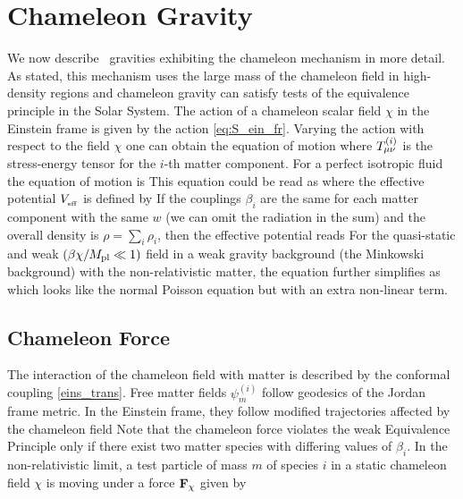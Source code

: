 \section{Chameleon Gravity}
\label{sec_cham}
We now describe \fR\ gravities exhibiting the chameleon mechanism in more detail. As stated, this mechanism uses the large mass of the chameleon field in high-density regions and chameleon gravity can satisfy tests of the equivalence principle in the Solar System. The action of a chameleon scalar field $\chi$ in the Einstein frame is given by the action \eqref{eq:S_ein_fr}. Varying the action with respect to the field $\chi$ one can obtain the equation of motion
where $T^{(i)}_{\mu\nu}$ is the stress-energy tensor for the $i$-th matter component. For a perfect isotropic fluid the equation of motion is
This equation could be read as
where the effective potential $V_{_\text{\tiny eff}}$ is defined by
If the couplings $\beta_i$ are the same for each matter component with the same $w$ (we can omit the radiation in the sum) and the overall density is $\rho=\sum_i\rho_i$, then the effective potential reads
For the quasi-static and weak $(\beta\chi/M_{\text{\scriptsize pl}}\ll1)$ field in a weak gravity background (the Minkowski background) with the non-relativistic matter, the equation further simplifies as
which looks like the normal Poisson equation but with an extra non-linear term.
\subsection{Chameleon Force}
The interaction of the chameleon field with matter is described by the conformal coupling \eqref{eins_trans}. Free matter fields $\psi_m^{(i)}$ follow geodesics of the Jordan frame metric. In the Einstein frame, they follow modified trajectories affected by the chameleon field \parencite{Waterhouse:2006wv}
Note that the chameleon force violates the weak Equivalence Principle only if there exist two matter species with differing values of $\beta_i$. In the non-relativistic limit, a test particle of mass $m$ of species $i$ in a static chameleon field $\chi$ is moving under a force $\mathbf{F}_\chi$ given by
